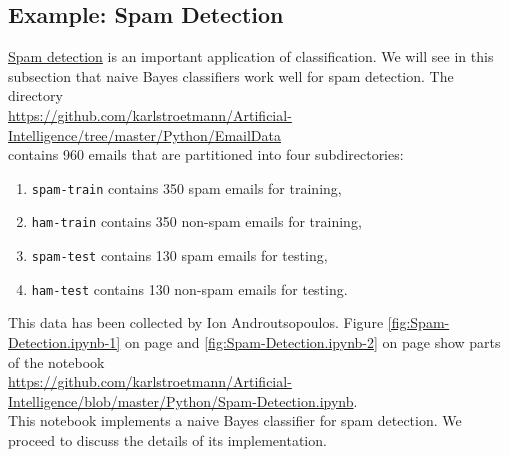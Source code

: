 \subsection{Example: Spam Detection}
\href{https://en.wikipedia.org/wiki/Naive_Bayes_spam_filtering}{Spam detection} is an important application of
classification.  We will see in this subsection that naive Bayes classifiers work well for spam detection.
The directory
\\[0.2cm]
\hspace*{1.3cm}
\href{https://github.com/karlstroetmann/Artificial-Intelligence/tree/master/Python/EmailData}{
https://github.com/karlstroetmann/Artificial-Intelligence/tree/master/Python/EmailData}
\\[0.2cm]
contains 960 emails that are partitioned into four subdirectories:
\begin{enumerate}
\item \texttt{spam-train} contains 350 spam emails for training,
\item \texttt{ham-train}  contains 350 non-spam emails for training,
\item \texttt{spam-test}  contains 130 spam emails for testing,
\item \texttt{ham-test}   contains 130 non-spam emails for testing.
\end{enumerate}
This data has been collected by Ion Androutsopoulos.  Figure \ref{fig:Spam-Detection.ipynb-1} on page
\pageref{fig:Spam-Detection.ipynb-1} and \ref{fig:Spam-Detection.ipynb-2} on page
\pageref{fig:Spam-Detection.ipynb-2} show parts of the notebook 
\\[0.2cm]
\hspace*{1.3cm}
\href{https://github.com/karlstroetmann/Artificial-Intelligence/blob/master/Python/Spam-Detection.ipynb}{
https://github.com/karlstroetmann/Artificial-Intelligence/blob/master/Python/Spam-Detection.ipynb}.
\\[0.2cm]
This notebook implements a naive Bayes classifier for spam detection.  We proceed to discuss the details of its
implementation.



